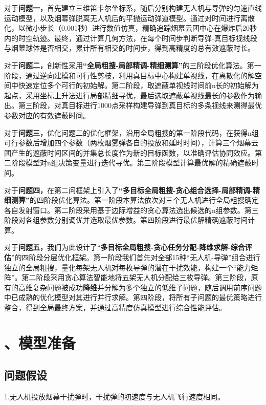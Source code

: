 \documentclass[12pt]{article}
\begin{document}
\begin{CJK}{UTF8}{gbsn}
		
		对于\textbf{问题一，}首先建立三维笛卡尔坐标系，随后分别构建无人机与导弹的匀速直线运动模型，以及烟幕弹脱离无人机后的平抛运动弹道模型。通过对时间进行离散化，以微小步长（0.001秒）进行数值仿真，精确追踪烟幕云团中心在爆炸后20秒内的时空轨迹。最终，通过计算几何方法，在每个时间步判断导弹-真目标视线段与烟幕球体是否相交，累计所有相交的时间步，得到高精度的总有效遮蔽时长。
		
		对于\textbf{问题二，}创新性采用\textbf{“全局粗搜-局部精调-精细测算”}的三阶段优化算法。第一阶段，通过逆向建模和可行性剪枝，利用真目标中心构建单视线，在离散化的解空间中快速定位多个可行的初始解。第二阶段，取遮蔽单视线时间前n长的初始解为起点，采用坐标上升法进行局部精细寻优，最后选取遮蔽单视线最长的参数作为输出。第三阶段，对真目标进行1000点采样构建导弹到真目标的多条视线来测得最优参数对应的有效遮蔽时间。
		
		对于\textbf{问题三，}优化问题二的优化框架，沿用全局粗搜的第一阶段代码，在获得n组可行参数后增加四个参数（两枚烟雾弹各自的投放和延时时间），计算三个烟幕云团产生的遮蔽时间区间的并集总长度作为新的目标函数，以准确评估协同效应。第二阶段模型对n组决策变量进行迭代寻优。第三阶段模型计算最优解的精确遮蔽时间。
		
		对于\textbf{问题四，}在第二问框架上引入了\textbf{“多目标全局粗搜-贪心组合选择-局部精调-精细测算”}的四阶段优化算法。第一阶段本算法依次对三个无人机进行全局粗搜确定各自发射窗口。第二阶段采用基于边际增益的贪心算法选出候选的n组参数。第三阶段对各组参数分别调优并选取最优参数。第四阶段进行最优解精确遮蔽时间计算。
		
		对于\textbf{问题五，}我们为此设计了“\textbf{多目标全局粗搜-贪心任务分配-降维求解-综合评估}”的四阶段分层优化框架。第一阶段我们首先对全部15种“无人机-导弹”组合进行独立的全局粗搜，量化每架无人机对每枚导弹的潜在干扰效能，构建一个“能力矩阵”。第二阶段采用贪心算法智能地将五架无人机分配给三枚导弹。第三阶段，原有的高维复杂问题被成功\textbf{降维}并分解为多个独立的低维子问题，随后调用前序问题中已成熟的优化模型对其进行并行求解。第四阶段，将所有子问题的最优策略进行整合，得到全局最终方案，并通过高精度仿真模型进行综合性能评估。
		
		
		\section{、模型准备}
		
		\subsection{问题假设}
		
		1.无人机投放烟幕干扰弹时，干扰弹的初速度与无人机飞行速度相同。
		

\end{CJK}
\end{document}
